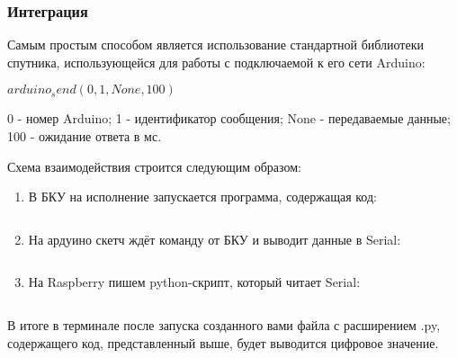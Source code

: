 
\subsubsection*{Интеграция}

Самым простым способом является использование стандартной библиотеки спутника, использующейся для работы с подключаемой к его сети Arduino:

$arduino_send(0, 1, None, 100)$

0 - номер Arduino;
1 - идентификатор сообщения;
None - передаваемые данные;
100 - ожидание ответа в мс.

Схема взаимодействия строится следующим образом:

\begin{enumerate}
    \item В БКУ на исполнение запускается программа, содержащая код:
    \inputminted[fontsize=\footnotesize, linenos]{python}{final/command_tour/dzz/task_02/source_5.py}
    \item На ардуино скетч ждёт команду от БКУ и выводит данные в Serial:
    \inputminted[fontsize=\footnotesize, linenos]{cpp}{final/command_tour/dzz/task_02/source_6.cpp}
    \item На Raspberry пишем python-скрипт, который читает Serial:
    \inputminted[fontsize=\footnotesize, linenos]{python}{final/command_tour/dzz/task_02/source_7.py}
\end{enumerate}

В итоге в терминале после запуска созданного вами файла с расширением .py, содержащего код, представленный выше, будет выводится цифровое значение.